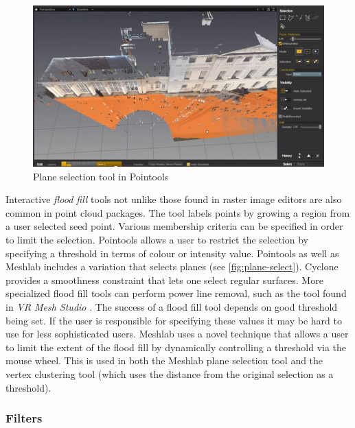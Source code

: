 
\begin{figure}[ht]
  \centreing
  \includegraphics[width=1\linewidth]{images/plane}
  \caption{Plane selection tool in Pointools \cite{Pointools2012}}
  \label{fig:plane-select}
\end{figure}

Interactive \emph{flood fill} tools not unlike those found in raster image editors are also common in point cloud packages. The tool labels points by growing a region from a user selected seed point. Various membership criteria can be specified in order to limit the selection. Pointools \cite{Pointools2012} allows a user to restrict the selection by specifying a threshold in terms of colour or intensity value. Pointools as well as Meshlab includes a variation that selects planes (see \autoref{fig:plane-select}). Cyclone \cite{Leica2012} provides a smoothness constraint that lets one select regular surfaces. More specialized flood fill tools can perform power line removal, such as the tool found in \emph{VR Mesh Studio} \cite{VirtualGrid2012}. The success of a flood fill tool depends on good threshold being set. If the user is responsible for specifying these values it may be hard to use for less sophisticated users. Meshlab uses a novel technique that allows a user to limit the extent of the flood fill by dynamically controlling a threshold via the mouse wheel. This is used in both the Meshlab plane selection tool and the vertex clustering tool (which uses the distance from the original selection as a threshold).

\subsubsection{Filters} \label{section:filters}

